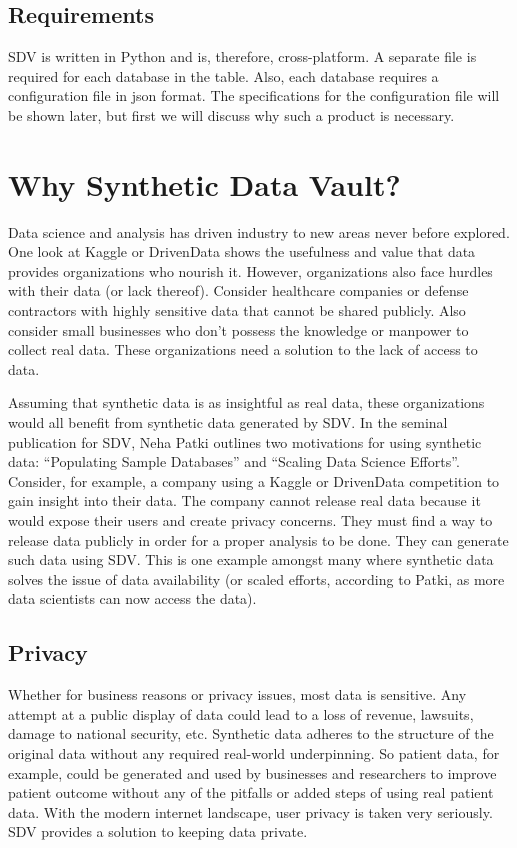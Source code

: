 \subsection{Requirements}

SDV is written in Python and is, therefore, cross-platform. A separate file
is required for each database in the table. Also, each database requires a
configuration file in json format. The specifications for the configuration
file will be shown later, but first we will discuss why such a product is
necessary.\cite{www-sdv-github}

\section{Why Synthetic Data Vault?}

Data science and analysis has driven industry to new areas never before
explored. One look at Kaggle or DrivenData shows the usefulness and value
that data provides organizations who nourish it. However, organizations
also face hurdles with their data (or lack thereof). Consider healthcare
companies or defense contractors with highly sensitive data that cannot
be shared publicly. Also consider small businesses who don't possess the
knowledge or manpower to collect real data. These organizations need a
solution to the lack of access to data.

Assuming that synthetic data is as insightful as real data, these
organizations would all benefit from synthetic data generated by SDV. In
the seminal publication for SDV, Neha Patki outlines two motivations for
using synthetic data: ``Populating Sample Databases'' and ``Scaling Data
Science Efforts''\cite{patki-sdv}. Consider, for example, a company using
a Kaggle or DrivenData competition to gain insight into their data. The
company cannot release real data because it would expose their users and
create privacy concerns. They must find a way to release data publicly in
order for a proper analysis to be done. They can generate such data using
SDV. This is one example amongst many where synthetic data solves the issue
of data availability (or scaled efforts, according to Patki, as more data
scientists can now access the data).

\subsection{Privacy}

Whether for business reasons or privacy issues, most data is sensitive. Any
attempt at a public display of data could lead to a loss of revenue, lawsuits,
damage to national security, etc. Synthetic data adheres to the structure of
the original data without any required real-world underpinning. So patient
data, for example, could be generated and used by businesses and researchers
to improve patient outcome without any of the pitfalls or added steps of
using real patient data. With the modern internet landscape, user privacy
is taken very seriously. SDV provides a solution to keeping data private.

